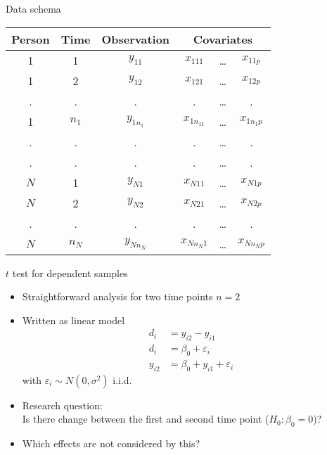 \documentclass{beamer}
\begin{document}
\begin{frame}{Data schema}
\vfill
\begin{center}
\begin{tabular}{cccccc}
\hline
Person & Time      & Observation & \multicolumn{3}{c}{Covariates}\\\hline
1      & 1         & $y_{11}$    & $x_{111}$   & \dots & $x_{11p}$  \\
1      & 2         & $y_{12}$    & $x_{121}$   & \dots & $x_{12p}$  \\
.      & .         & .           & .           & \dots & .          \\
1      & $n_1$     & $y_{1n_1}$  & $x_{1n_11}$ & \dots & $x_{1n_1p}$\\
.      & .         & .           & .           & \dots & .          \\
.      & .         & .           & .           & \dots & .          \\
$N$    & 1         & $y_{N1}$    & $x_{N11}$   & \dots & $x_{N1p}$  \\
$N$    & 2         & $y_{N2}$    & $x_{N21}$   & \dots & $x_{N2p}$  \\
.      & .         & .           & .           & \dots & .          \\
$N$    & $n_N$     & $y_{Nn_N}$  & $x_{Nn_N1}$ & \dots & $x_{Nn_Np}$\\
\hline
\end{tabular}
\end{center}
\vfill
\end{frame}

\begin{frame}{$t$ test for dependent samples}
\begin{itemize}
  \item Straightforward analysis for two time points $n = 2$
  \item Written as linear model
    \begin{align*}
         d_i &= y_{i2} - y_{i1} \\
         d_i &= \beta_0 + \varepsilon_i \\
      y_{i2} &= \beta_0 + y_{i1} + \varepsilon_i
    \end{align*}
    with $\varepsilon_i \sim N(0, \sigma^2)$ i.i.d.
  \item Research question:\\
    Is there change between the first and second time point ($H_0\colon \beta_0 = 0$)?
  \item Which effects are not considered by this?
\end{itemize}
\end{frame}
\end{document}
